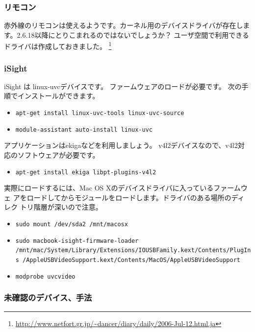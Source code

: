 \documentclass[mingoth,a4paper]{jsarticle}
\begin{document}
\subsubsection{リモコン}

赤外線のリモコンは使えるようです。カーネル用のデバイスドライバが存在しま
す。2.6.18以降にとりこまれるのではないでしょうか？
ユーザ空間で利用できるドライバは作成しておきました。
\footnote{\url{http://www.netfort.gr.jp/~dancer/diary/daily/2006-Jul-12.html.ja}}

\subsubsection{iSight}

iSight は linux-uvcデバイスです。
ファームウェアのロードが必要です。
次の手順でインストールができます。

\begin{itemize}
 \item \texttt{apt-get install linux-uvc-tools linux-uvc-source}
 \item \texttt{module-assistant auto-install linux-uvc}
\end{itemize}

アプリケーションはekigaなどを利用しましょう。
v4l2デバイスなので、v4l2対応のソフトウェアが必要です。

\begin{itemize}
 \item \texttt{apt-get install ekiga libpt-plugins-v4l2}
\end{itemize}

実際にロードするには、Mac OS Xのデバイスドライバに入っているファームウェ
アをロードしてからモジュールをロードします。ドライバのある場所のディレク
トリ階層が深いので注意。

\begin{itemize}
 \item \texttt{sudo mount /dev/sda2 /mnt/macosx}
 \item \texttt{sudo macbook-isight-firmware-loader
       /mnt/mac/System/Library/Extensions/IOUSBFamily.kext/Contents/PlugIns
       /AppleUSBVideoSupport.kext/Contents/MacOS/AppleUSBVideoSupport}
 \item \texttt{modprobe uvcvideo}
\end{itemize}


\subsubsection{未確認のデバイス、手法}
\end{document}
